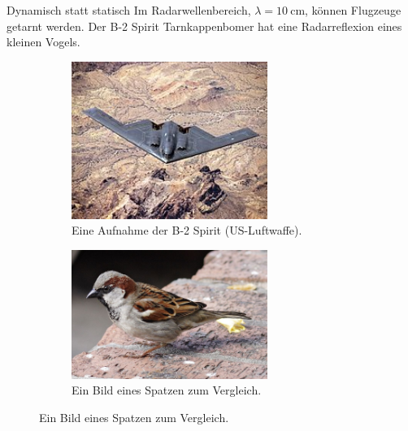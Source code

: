 \begin{frame}{Dynamisch statt statisch}
  Im Radarwellenbereich, $λ = \SI{10}{\centi\meter}$, können Flugzeuge getarnt werden.
  Der B-2 Spirit Tarnkappenbomer hat eine Radarreflexion eines kleinen Vogels.
  \begin{figure}
    \centering
    \begin{subfigure}{0.48\textwidth}
      \centering
      \caption{Eine Aufnahme der B-2 Spirit (US-Luftwaffe). \cite{b2spirit}}
      \includegraphics[width=0.7\textwidth]{images/b2spirit.jpg}
    \end{subfigure}
    \begin{subfigure}{0.48\textwidth}
      \centering
      \caption{Ein Bild eines Spatzen zum Vergleich. \cite{spatz}}
      \includegraphics[width=0.7\textwidth]{images/spatz.jpg}
    \end{subfigure}
  \end{figure}
\end{frame}

